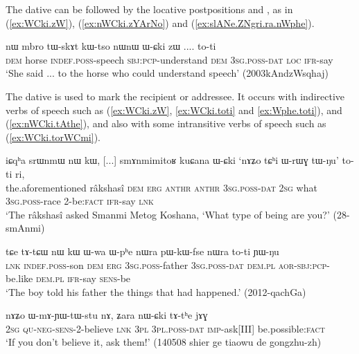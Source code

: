 The dative can be followed by the locative postpositions  and , as in (\ref{ex:WCki.zW}), (\ref{ex:nWCki.zYArNo}) and (\ref{ex:slANe.ZNgri.ra.nWphe}).


\begin{exe}
\ex \label{ex:WCki.zW}
\gll nɯ mbro tɯ-skɤt kɯ-tso nɯnɯ ɯ-ɕki zɯ .... to-ti \\
\textsc{dem} horse \textsc{indef}.\textsc{poss}-speech \textsc{sbj}:\textsc{pcp}-understand \textsc{dem} \textsc{3sg}.\textsc{poss}-\textsc{dat} \textsc{loc} { } \textsc{ifr}-say \\
\glt `She said ... to the horse who could understand speech' (2003kAndzWsqhaj)
\end{exe}

The dative is used to mark the recipient or addressee. It occurs with indirective verbs of speech such as  (\ref{ex:WCki.zW}, \ref{ex:WCki.toti} and \ref{ex:Wphe.toti}),  and  (\ref{ex:nWCki.tAthe}), and also with some intransitive verbs of speech such as  (\ref{ex:WCki.torWCmi}).

\begin{exe}
\ex \label{ex:WCki.toti}
\gll iɕqʰa srɯnmɯ nɯ kɯ, [...] smɤnmimitoʁ kuɕana ɯ-ɕki `nɤʑo tɕʰi ɯ-rɯɣ tɯ-ŋu' to-ti ri, \\
the.aforementioned râkshasî \textsc{dem} \textsc{erg} { }  \textsc{anthr} \textsc{anthr} \textsc{3sg}.\textsc{poss}-\textsc{dat} \textsc{2sg} what \textsc{3sg}.\textsc{poss}-race 2-be:\textsc{fact} \textsc{ifr}-say \textsc{lnk} \\
\glt `The râkshasî asked Smanmi Metog Koshana, `What type of being are you?' (28-smAnmi)
\end{exe}

\begin{exe}
\ex \label{ex:Wphe.toti}
\gll tɕe tɤ-tɕɯ nɯ kɯ ɯ-wa ɯ-pʰe nɯra pɯ-kɯ-fse nɯra to-ti ɲɯ-ŋu \\
\textsc{lnk} \textsc{indef}.\textsc{poss}-son \textsc{dem} \textsc{erg} \textsc{3sg}.\textsc{poss}-father \textsc{3sg}.\textsc{poss}-\textsc{dat} \textsc{dem}.\textsc{pl} \textsc{aor}-\textsc{sbj}:\textsc{pcp}-be.like \textsc{dem}.\textsc{pl}  \textsc{ifr}-say \textsc{sens}-be \\
\glt `The boy told his father the things that had happened.' (2012-qachGa)
\end{exe}

\begin{exe}
\ex \label{ex:nWCki.tAthe}
\gll nɤʑo ɯ-mɤ-ɲɯ-tɯ-stu nɤ, ʑara nɯ-ɕki tɤ-tʰe jɤɣ \\
\textsc{2sg} \textsc{qu}-\textsc{neg}-\textsc{sens}-2-believe \textsc{lnk} \textsc{3pl} \textsc{3pl}.\textsc{poss}-\textsc{dat} \textsc{imp}-ask[III] be.possible:\textsc{fact} \\
\glt `If you don't believe it, ask them!' (140508 shier ge tiaowu de gongzhu-zh)
\end{exe}

